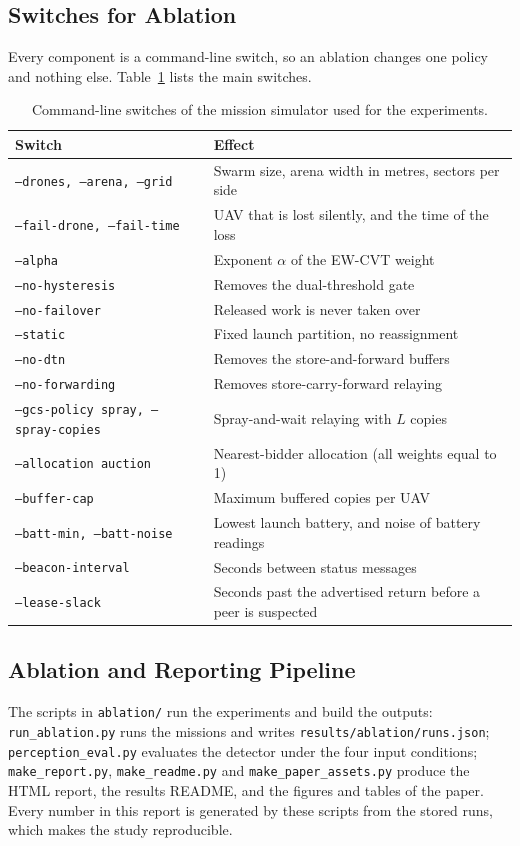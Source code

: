 \documentclass[10pt,letterpaper]{article}
\begin{document}
\subsection{Switches for Ablation}
Every component is a command-line switch, so an ablation changes one policy and nothing else. Table~\ref{tab:switch} lists the main switches.

\begin{table}[H]
\centering\small
\caption{Command-line switches of the mission simulator used for the experiments.}\label{tab:switch}
\begin{tabular}{p{3.8cm}p{10.4cm}}
\toprule
Switch & Effect\\
\midrule
\texttt{--drones, --arena, --grid} & Swarm size, arena width in metres, sectors per side\\
\texttt{--fail-drone, --fail-time} & UAV that is lost silently, and the time of the loss\\
\texttt{--alpha} & Exponent $\alpha$ of the EW-CVT weight\\
\texttt{--no-hysteresis} & Removes the dual-threshold gate\\
\texttt{--no-failover} & Released work is never taken over\\
\texttt{--static} & Fixed launch partition, no reassignment\\
\texttt{--no-dtn} & Removes the store-and-forward buffers\\
\texttt{--no-forwarding} & Removes store-carry-forward relaying\\
\texttt{--gcs-policy spray, --spray-copies} & Spray-and-wait relaying with $L$ copies\\
\texttt{--allocation auction} & Nearest-bidder allocation (all weights equal to 1)\\
\texttt{--buffer-cap} & Maximum buffered copies per UAV\\
\texttt{--batt-min, --batt-noise} & Lowest launch battery, and noise of battery readings\\
\texttt{--beacon-interval} & Seconds between status messages\\
\texttt{--lease-slack} & Seconds past the advertised return before a peer is suspected\\
\bottomrule
\end{tabular}
\end{table}

\subsection{Ablation and Reporting Pipeline}
The scripts in \texttt{ablation/} run the experiments and build the outputs: \texttt{run\_ablation.py} runs the missions and writes \texttt{results/ablation/runs.json}; \texttt{perception\_eval.py} evaluates the detector under the four input conditions; \texttt{make\_report.py}, \texttt{make\_readme.py} and \texttt{make\_paper\_assets.py} produce the HTML report, the results README, and the figures and tables of the paper. Every number in this report is generated by these scripts from the stored runs, which makes the study reproducible.
\end{document}
